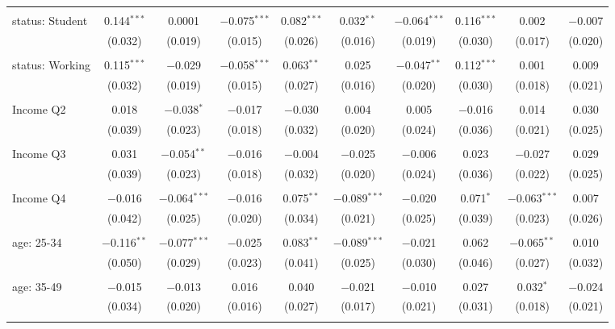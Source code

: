 \begin{tabular}{@{\extracolsep{5pt}}lccccccccc}
  & & & & & & & & & \\ 
 status: Student & 0.144$^{***}$ & 0.0001 & $-$0.075$^{***}$ & 0.082$^{***}$ & 0.032$^{**}$ & $-$0.064$^{***}$ & 0.116$^{***}$ & 0.002 & $-$0.007 \\ 
  & (0.032) & (0.019) & (0.015) & (0.026) & (0.016) & (0.019) & (0.030) & (0.017) & (0.020) \\ 
  & & & & & & & & & \\ 
 status: Working & 0.115$^{***}$ & $-$0.029 & $-$0.058$^{***}$ & 0.063$^{**}$ & 0.025 & $-$0.047$^{**}$ & 0.112$^{***}$ & 0.001 & 0.009 \\ 
  & (0.032) & (0.019) & (0.015) & (0.027) & (0.016) & (0.020) & (0.030) & (0.018) & (0.021) \\ 
  & & & & & & & & & \\ 
 Income Q2 & 0.018 & $-$0.038$^{*}$ & $-$0.017 & $-$0.030 & 0.004 & 0.005 & $-$0.016 & 0.014 & 0.030 \\ 
  & (0.039) & (0.023) & (0.018) & (0.032) & (0.020) & (0.024) & (0.036) & (0.021) & (0.025) \\ 
  & & & & & & & & & \\ 
 Income Q3 & 0.031 & $-$0.054$^{**}$ & $-$0.016 & $-$0.004 & $-$0.025 & $-$0.006 & 0.023 & $-$0.027 & 0.029 \\ 
  & (0.039) & (0.023) & (0.018) & (0.032) & (0.020) & (0.024) & (0.036) & (0.022) & (0.025) \\ 
  & & & & & & & & & \\ 
 Income Q4 & $-$0.016 & $-$0.064$^{***}$ & $-$0.016 & 0.075$^{**}$ & $-$0.089$^{***}$ & $-$0.020 & 0.071$^{*}$ & $-$0.063$^{***}$ & 0.007 \\ 
  & (0.042) & (0.025) & (0.020) & (0.034) & (0.021) & (0.025) & (0.039) & (0.023) & (0.026) \\ 
  & & & & & & & & & \\ 
 age: 25-34 & $-$0.116$^{**}$ & $-$0.077$^{***}$ & $-$0.025 & 0.083$^{**}$ & $-$0.089$^{***}$ & $-$0.021 & 0.062 & $-$0.065$^{**}$ & 0.010 \\ 
  & (0.050) & (0.029) & (0.023) & (0.041) & (0.025) & (0.030) & (0.046) & (0.027) & (0.032) \\ 
  & & & & & & & & & \\ 
 age: 35-49 & $-$0.015 & $-$0.013 & 0.016 & 0.040 & $-$0.021 & $-$0.010 & 0.027 & 0.032$^{*}$ & $-$0.024 \\ 
  & (0.034) & (0.020) & (0.016) & (0.027) & (0.017) & (0.021) & (0.031) & (0.018) & (0.021) \\ 
  & & & & & & & & & \\ 

\end{tabular}
